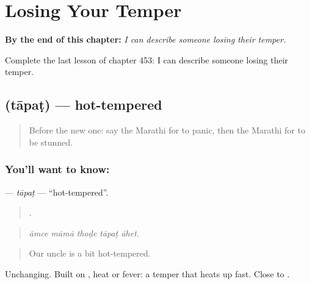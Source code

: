 
\chapter{Losing Your Temper}
\label{ch:mr-losing-your-temper}

\begin{chapteropening}
\textbf{By the end of this chapter:} \emph{I can describe someone losing their temper.}

Complete the last lesson of chapter 453: I can describe someone losing their temper.
\end{chapteropening}

\section[\texorpdfstring{\mr{तापट} (tāpaṭ)}{तापट (tāpaṭ)}]{ (tāpaṭ) — hot-tempered}

\label{lesson:MR-C453-tapat}



\begin{quote}
Before the new one: say the Marathi for to panic, then the Marathi for to be stunned.
\end{quote}

\subsection*{You'll want to know: }
\textbf{} — \emph{tāpaṭ} — \textquotedblleft{}hot-tempered\textquotedblright{}.

\begin{quote}
    .
\end{quote}

\begin{quote}
\emph{āmce māmā thoḍe tāpaṭ āhet.}
\end{quote}

\begin{quote}
Our uncle is a bit hot-tempered.
\end{quote}

Unchanging. Built on , heat or fever: a temper that heats up fast. Close to .

